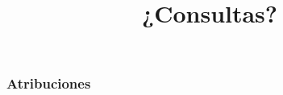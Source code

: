 \documentclass[11pt,a4paper,spanish]{beamer}
\begin{document}
\begin{frame}

\title{¿Consultas?}
\maketitle
\end{frame}

\setcounter{lastPage}{\number\value{page}}

\begin{frame}%

\frametitle{Atribuciones}


\tiny

\end{frame}

\setcounter{page}{\number\value{lastPage}}
\end{document}

